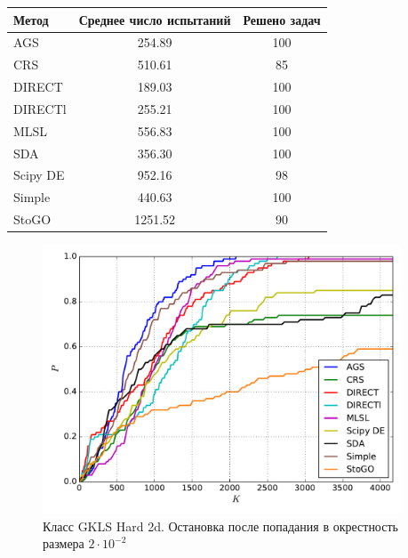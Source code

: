 \documentclass[a4paper]{article}
\begin{document}
\begin{tabular}{lcc}
\hline
 Метод    &  Среднее число испытаний  &  Решено задач  \\
\hline
 AGS      &          254.89           &      100       \\
 CRS      &          510.61           &       85       \\
 DIRECT   &          189.03           &      100       \\
 DIRECTl  &          255.21           &      100       \\
 MLSL     &          556.83           &      100       \\
 SDA      &          356.30           &      100       \\
 Scipy DE &          952.16           &       98       \\
 Simple   &          440.63           &      100       \\
 StoGO    &          1251.52          &       90       \\
\hline
\end{tabular}
\begin{figure}[H]
  \center
  \includegraphics[width=0.95\textwidth]{../experiments/gklsh2d/cmc.pdf}
  \caption{Класс GKLS Hard 2d. Остановка после попадания в окрестность размера $2\cdot10^{-2}$}
  \label{fig:}
\end{figure}
\end{document}

